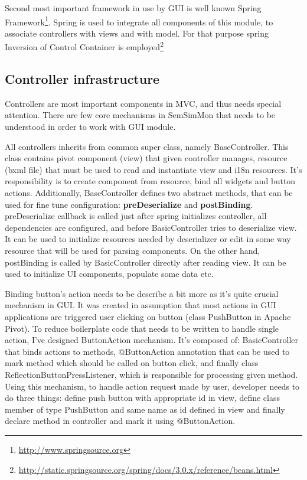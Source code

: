 Second most important framework in use by GUI is well known Spring
Framework\footnote{\url{http://www.springsource.org}}. Spring is used to integrate all components of this module,
to associate controllers with views and with model. For that purpose spring Inversion of Control Container is
employed\footnote{\url{http://static.springsource.org/spring/docs/3.0.x/reference/beans.html}}

\subsection{Controller infrastructure}

Controllers are most important components in MVC, and thus needs special attention. There are few core mechanisms in
SemSimMon that needs to be understood in order to work with GUI module. 

All controllers inherits from common super class, namely BaseController. This class contains pivot component (view)
that given controller manages, resource (bxml file) that must be used to read and instantiate view and i18n resources. 
It's responsibility is to create component from resource, bind all widgets and button actions. Additionally,
BaseController defines two abstract methods, that can be used for fine tune configuration: \textbf{preDeserialize} and
\textbf{postBinding}. preDeserialize callback is called just after spring initializes controller, all dependencies are
configured, and before BasicController tries to deserialize view. It can be used to initialize resources
needed by deserializer or edit in some way resource that will be used for parsing components. On the other hand,
postBinding is called by BasicController directly after reading view. It can be used to initialize UI components,
populate some data etc.

Binding button's action needs to be describe a bit more as it's quite crucial mechanism in GUI. It was created in
assumption that most actions in GUI applications are triggered user clicking on button (class PushButton in Apache
Pivot). To reduce boilerplate code that needs to be written to handle single action, I've designed ButtonAction
mechanism. It's composed of: BasicController that binds actions to methods, @ButtonAction annotation that can be used
to mark method which should be called on button click, and finally class ReflectionButtonPressListener, which is
responsible for processing given method. Using this mechanism, to handle action request made by user, developer needs
to do three things: define push button with appropriate id in view, define class member of type PushButton and same
name as id defined in view and finally declare method in controller and mark it using @ButtonAction. 

